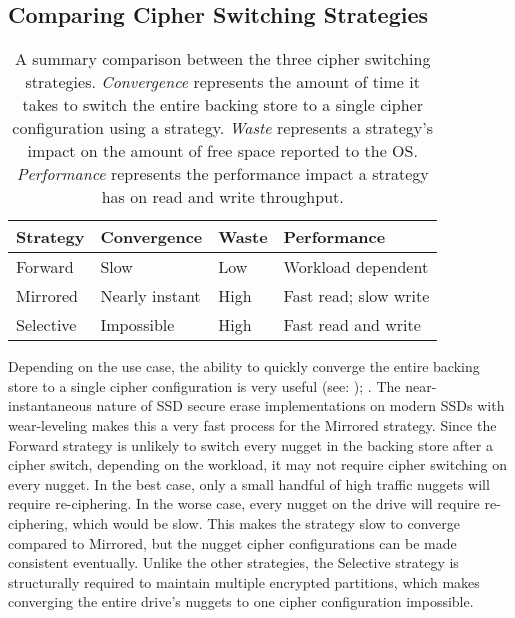 \subsection{Comparing Cipher Switching Strategies}

\begin{table}[]
   \begin{tabular}{@{}llll@{}}
   \toprule
   \textbf{Strategy} & \textbf{Convergence} & \textbf{Waste} & \textbf{Performance} \\ \midrule
   Forward   & Slow           & Low  & Workload dependent    \\
   Mirrored  & Nearly instant & High & Fast read; slow write \\
   Selective & Impossible     & High & Fast read and write   \\
   \end{tabular}
   \caption{A summary comparison between the three cipher switching strategies.
   \emph{Convergence} represents the amount of time it takes to switch the
   entire backing store to a single cipher configuration using a strategy.
   \emph{Waste} represents a strategy's impact on the amount of free space
   reported to the OS. \emph{Performance} represents the performance impact a
   strategy has on read and write throughput.}
   \label{tbl:strategies-advantages}
\end{table}

Depending on the use case, the ability to quickly converge the entire backing
store to a single cipher configuration is very useful (see: );
. The near-instantaneous nature of SSD secure erase implementations on
modern SSDs with wear-leveling makes this a very fast process for the Mirrored
strategy. Since the Forward strategy is unlikely to switch every nugget in the
backing store after a cipher switch, depending on the workload, it may not
require cipher switching on every nugget. In the best case, only a small handful
of high traffic nuggets will require re-ciphering. In the worse case, every
nugget on the drive will require re-ciphering, which would be slow. This makes
the strategy slow to converge compared to Mirrored, but the nugget cipher
configurations can be made consistent eventually. Unlike the other strategies,
the Selective strategy is structurally required to maintain multiple encrypted
partitions, which makes converging the entire drive's nuggets to one cipher
configuration impossible.

